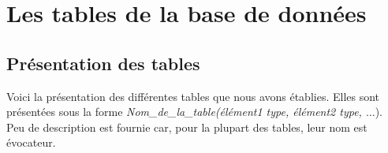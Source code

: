 \section{Les tables de la base de donn\'ees}

\subsection{Pr\'esentation des tables}
Voici la pr\'esentation des diff\'erentes tables que nous avons \'etablies. Elles sont pr\'esent\'ees sous la forme \textit{Nom\_de\_la\_table(\'el\'ement1 type, \'el\'ement2 type, $\dots$}). Peu de description est fournie car, pour la plupart des tables, leur nom est \'evocateur.
\\

